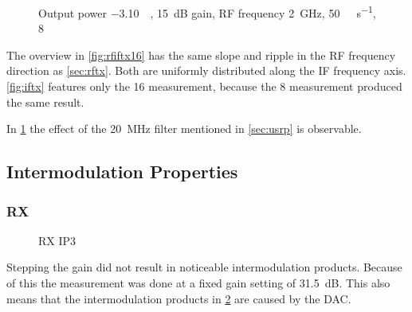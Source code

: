 \documentclass[12pt,a4paper,parskip=full]{scrartcl}
\begin{document}
\begin{figure}[htb]
    \centering
{}
    \caption{Output power \SI{-3.10}{\deci\belfs}, \SI{15}{\deci\bel} gain, RF frequency \SI{2}{\giga\hertz}, \SI{50}{\mega\samples\per\second}, \SI{8}{\bit}}
    \label{fig:iftx50}
\end{figure}
The overview in \cref{fig:rfiftx16} has the same slope and ripple
in the RF frequency direction as \cref{sec:rftx}. Both are uniformly
distributed along the IF frequency axis. \cref{fig:iftx} features only the \SI{16}{\bit}
measurement, because the \SI{8}{\bit} measurement produced the same result.

In \ref{fig:iftx50} the effect of the \SI{20}{\mega\hertz} filter mentioned in \cref{sec:usrp} is
observable.

\clearpage
\subsection{Intermodulation Properties}
\subsubsection{RX}
\begin{figure}[htb]
    \centering
{}
    \caption{RX IP3}
    \label{fig:rxip3}
\end{figure}
Stepping the gain did not result in noticeable intermodulation products.
Because of this the measurement was done at a fixed gain setting of
\SI{31.5}{\deci\bel}. This also means that the intermodulation products
in \cref{fig:rxip3} are caused by the DAC.
\end{document}
